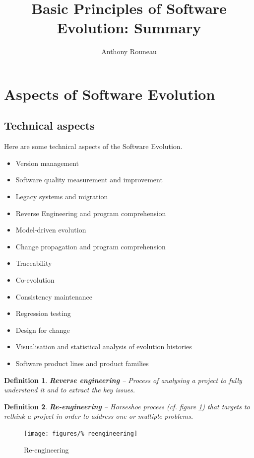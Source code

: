 \documentclass[a4paper,11pt]{report}
\title{Basic Principles of Software Evolution: Summary}
\author{Anthony Rouneau}
\newtheorem{definition}{Definition}
\begin{document}
\maketitle
\newpage
%
\section{Aspects of Software Evolution}
	\subsection{Technical aspects}
		Here are some technical aspects of the
			Software Evolution.
		\begin{itemize}
			\item Version management
			\item Software quality measurement
				and improvement
			\item Legacy systems and migration
			\item Reverse Engineering and program
				comprehension
			\item Model-driven evolution
			\item Change propagation and program
				comprehension
			\item Traceability
			\item Co-evolution
			\item Consistency maintenance
			\item Regression testing
			\item Design for change
			\item Visualisation and statistical
				analysis of evolution histories
			\item Software product lines and 
				product families
		\end{itemize}
		\begin{definition}
			\textbf{Reverse engineering} --
				Process of analysing a project to fully
				understand it and to extract the key
				issues.
		\end{definition}
		\begin{definition}
			\textbf{Re-engineering} -- 
				Horseshoe process (cf. figure
				\ref{fig:reengineering}) that targets
				to rethink a project in order to
				address one or multiple problems.
		\end{definition}
		\begin{figure}[H]
			\centering
			\texttt{[image: figures/\%
			reengineering]}
			\caption{Re-engineering}%
			\label{fig:reengineering}
		\end{figure}\noindent
\end{document}
